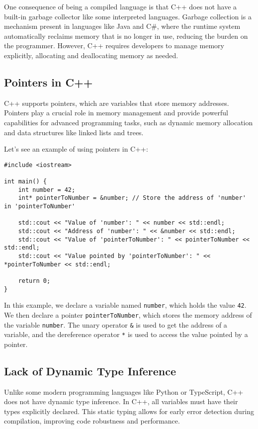 \documentclass{article}
\begin{document}
One consequence of being a compiled language is that C++ does not have a built-in garbage collector like some interpreted languages. Garbage collection is a mechanism present in languages like Java and C#, where the runtime system automatically reclaims memory that is no longer in use, reducing the burden on the programmer. However, C++ requires developers to manage memory explicitly, allocating and deallocating memory as needed.

\subsection{Pointers in C++}
C++ supports pointers, which are variables that store memory addresses. Pointers play a crucial role in memory management and provide powerful capabilities for advanced programming tasks, such as dynamic memory allocation and data structures like linked lists and trees.

Let's see an example of using pointers in C++:

\begin{verbatim}
#include <iostream>

int main() {
    int number = 42;
    int* pointerToNumber = &number; // Store the address of 'number' in 'pointerToNumber'

    std::cout << "Value of 'number': " << number << std::endl;
    std::cout << "Address of 'number': " << &number << std::endl;
    std::cout << "Value of 'pointerToNumber': " << pointerToNumber << std::endl;
    std::cout << "Value pointed by 'pointerToNumber': " << *pointerToNumber << std::endl;

    return 0;
}
\end{verbatim}

In this example, we declare a variable named \texttt{number}, which holds the value \texttt{42}. We then declare a pointer \texttt{pointerToNumber}, which stores the memory address of the variable \texttt{number}. The unary operator \texttt{\&} is used to get the address of a variable, and the dereference operator \texttt{*} is used to access the value pointed by a pointer.

\subsection{Lack of Dynamic Type Inference}
Unlike some modern programming languages like Python or TypeScript, C++ does not have dynamic type inference. In C++, all variables must have their types explicitly declared. This static typing allows for early error detection during compilation, improving code robustness and performance.
\end{document}
